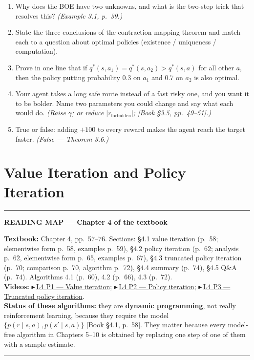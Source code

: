 \documentclass[11pt, letterpaper]{article}
\theoremstyle{runin}
\theoremstyle{runinplain}
\theoremstyle{remark}
\newcommand{\bkin}[1]{{\color{bookblue}\small[\textsf{Book #1}]}}
\newcommand{\vid}[2]{{\color{vidred}\small$\playbutton$\,\href{#2}{\textsf{#1}}}}
\newcommand{\playbutton}{\blacktriangleright}
\newenvironment{roadmap}[1]
  {\par\medskip\noindent\rule{\textwidth}{0.9pt}\par\nobreak\vspace{0.25em}
   \noindent\textbf{\small READING MAP --- #1}\par\nobreak\vspace{0.15em}
   \small}
  {\par\nobreak\vspace{0.25em}\noindent\rule{\textwidth}{0.9pt}\par\medskip}
\begin{document}
\begin{enumerate}
  \item Why does the BOE have two unknowns, and what is the two-step trick that
        resolves this? \emph{(Example 3.1, p.~39.)}
  \item State the three conclusions of the contraction mapping theorem and match
        each to a question about optimal policies (existence / uniqueness /
        computation).
  \item Prove in one line that if $q^*(s,a_1)=q^*(s,a_2)>q^*(s,a)$ for all other
        $a$, then the policy putting probability $0.3$ on $a_1$ and $0.7$ on $a_2$
        is also optimal.
  \item Your agent takes a long safe route instead of a fast risky one, and you
        want it to be bolder. Name two parameters you could change and say what
        each would do. \emph{(Raise $\gamma$; or reduce $|r_{\text{forbidden}}|$;
        \bkin{\S3.5, pp.~49--51}.)}
  \item True or false: adding $+100$ to every reward makes the agent reach the
        target faster. \emph{(False --- Theorem 3.6.)}
\end{enumerate}

\newpage
\section{Value Iteration and Policy Iteration}

\begin{roadmap}{Chapter 4 of the textbook}
\textbf{Textbook:} Chapter 4, pp.~57--76. Sections: \S4.1 value iteration (p.~58;
elementwise form p.~58, examples p.~59), \S4.2 policy iteration (p.~62; analysis
p.~62, elementwise form p.~65, examples p.~67), \S4.3 truncated policy iteration
(p.~70; comparison p.~70, algorithm p.~72), \S4.4 summary (p.~74), \S4.5 Q\&A
(p.~74). Algorithms 4.1 (p.~60), 4.2 (p.~66), 4.3 (p.~72).\\[0.3em]
\textbf{Videos:}
\vid{L4 P1 --- Value iteration}{https://www.youtube.com/watch?v=wMAVmLDIvQU};
\vid{L4 P2 --- Policy iteration}{https://www.youtube.com/watch?v=Pka6Om0nYQ8};
\vid{L4 P3 --- Truncated policy iteration}{https://www.youtube.com/watch?v=tUjPFPD3Vc8}.\\[0.3em]
\textbf{Status of these algorithms:} they are \textbf{dynamic programming}, not
really reinforcement learning, because they require the model
$\{p(r\mid s,a),p(s'\mid s,a)\}$ \bkin{\S4.1, p.~58}. They matter because every
model-free algorithm in Chapters 5--10 is obtained by replacing one step of one of
them with a sample estimate.
\end{roadmap}
\end{document}

